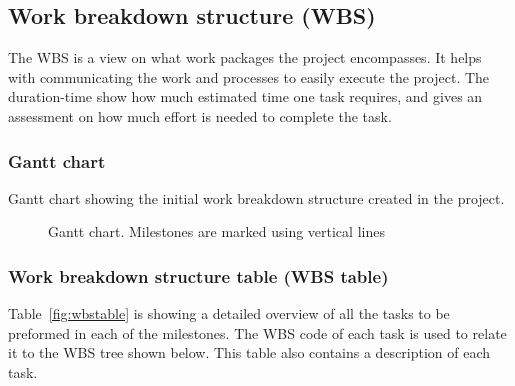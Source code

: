 \subsection{Work breakdown structure (WBS)}
The WBS is a view on what work packages the project encompasses. It helps with communicating the work and processes to easily execute the project. The duration-time show how much estimated time one task requires, and gives an assessment on how much effort is needed to complete the task.

\subsubsection{Gantt chart}
Gantt chart showing the initial work breakdown structure created in the project.
\begin{figure}[H]
\caption{Gantt chart. Milestones are marked using vertical lines}
\end{figure}

\subsubsection{Work breakdown structure table (WBS table)}
Table~\ref{fig:wbstable} is showing a detailed overview of all the tasks to be preformed in each of the milestones. The WBS code of each task is used to relate it to the WBS tree shown below. This table also contains a description of each task.



